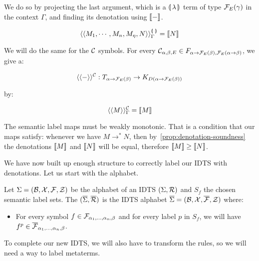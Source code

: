 We do so by projecting the last argument, which is a $\llparenthesis \, \lambda \, \rrparenthesis$
term of type $\mathcal{F}_E(\gamma)$ in the context $\Gamma$, and finding its
denotation using $\llbracket - \rrbracket$.

$$
\langle\langle M_1, \cdots, M_n, M_\eta, N\rangle\rangle^{\llparenthesis \,  \, \rrparenthesis}_\Gamma = \llbracket N \rrbracket
$$

We will do the same for the $\mathcal{C}$ symbols. For every
$\mathcal{C}_{\alpha,\beta,E} \in F_{\alpha \to \mathcal{F}_E(\beta),\mathcal{F}_E(\alpha \to
  \beta)}$, we give a:

$$
\langle\langle-\rangle\rangle^{\mathcal{C}} : T_{\alpha \to \mathcal{F}_E(\beta)} \to K_{D(\alpha \to \mathcal{F}_E(\beta))}
$$

by:

$$
\langle\langle M\rangle\rangle^{\mathcal{C}}_\Gamma = \llbracket M \rrbracket
$$

The semantic label maps must be weakly monotonic. That is a condition that
our maps satisfy: whenever we have $M \to^* N$, then
by~\ref{prop:denotation-soundness} the denotations $\llbracket M \rrbracket$ and $\llbracket N \rrbracket$
will be equal, therefore $\llbracket M \rrbracket \ge \llbracket N \rrbracket$.

We have now built up enough structure to correctly label our IDTS with
denotations. Let us start with the alphabet.

\begin{definition}
  Let $\Sigma = (\mathcal{B}, \mathcal{X}, \mathcal{F}, \mathcal{Z})$ be the alphabet of an IDTS
  $(\Sigma, \mathcal{R})$ and $S_f$ the chosen semantic label sets. The
  $(\overline{\Sigma}, \overline{\mathcal{R}})$ is the IDTS alphabet
  $\overline{\Sigma} = (\mathcal{B}, \mathcal{X}, \overline{\mathcal{F}}, \mathcal{Z})$ where:

  \begin{itemize}
  \item For every symbol $f \in \mathcal{F}_{\alpha_1,\ldots,\alpha_n,\beta}$ and
    for every label $p$ in $S_f$, we will have
    $f^p \in \overline{\mathcal{F}}_{\alpha_1,\ldots,\alpha_n,\beta}$.
  \end{itemize}
\end{definition}

To complete our new IDTS, we will also have to transform the rules, so we
will need a way to label metaterms.

